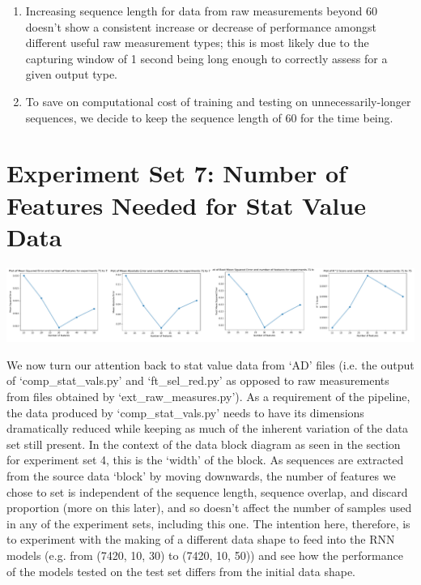\documentclass[12pt,twoside]{report}
\begin{document}
\begin{enumerate}
	\item Increasing sequence length for data from raw measurements beyond 60 doesn’t show a consistent increase or decrease of performance amongst different useful raw measurement types; this is most likely due to the capturing window of 1 second being long enough to correctly assess for a given output type.
	\item To save on computational cost of training and testing on unnecessarily-longer sequences, we decide to keep the sequence length of 60 for the time being.
\end{enumerate}




\section{Experiment Set 7: Number of Features Needed for Stat Value Data}

\begin{center}
\includegraphics[scale=0.35]{project_figures/fig10_14}
\end{center}

\quad We now turn our attention back to stat value data from ‘AD’ files (i.e. the output of ‘comp\_stat\_vals.py’ and ‘ft\_sel\_red.py’ as opposed to raw measurements from files obtained by ‘ext\_raw\_measures.py’). As a requirement of the pipeline, the data produced by ‘comp\_stat\_vals.py’ needs to have its dimensions dramatically reduced while keeping as much of the inherent variation of the data set still present. In the context of the data block diagram as seen in the section for experiment set 4, this is the ‘width’ of the block. As sequences are extracted from the source data ‘block’ by moving downwards, the number of features we chose to set is independent of the sequence length, sequence overlap, and discard proportion (more on this later), and so doesn’t affect the number of samples used in any of the experiment sets, including this one. The intention here, therefore, is to experiment with the making of a different data shape to feed into the RNN models (e.g. from (7420, 10, 30) to (7420, 10, 50)) and see how the performance of the models tested on the test set differs from the initial data shape.\\
\end{document}
